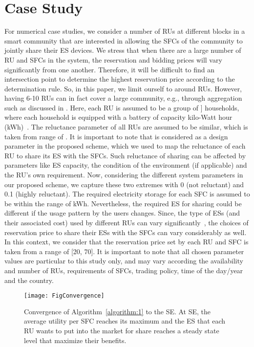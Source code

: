\documentclass[journal,10pt]{IEEEtran}
\begin{document}
\section{Case Study}\label{sec:case-study}
For numerical case studies, we consider a number of RUs at different blocks in a smart community that are interested in allowing the SFCs of the community to jointly share their ES devices. We stress that when there are a large number of RU and SFCs in the system, the reservation and bidding prices will vary significantly from one another. Therefore, it will be difficult to find an intersection point to determine the highest reservation price  according to the determination rule. So, in this paper, we limit ourself to around  RUs. However, having 6-10 RUs can in fact cover a large community, e.g., through aggregation such as discussed in \cite{Gkatzikis:2013,Wayes-J-TSG:2012}. Here, each RU is assumed to be a group of ] households, where each household is equipped with a battery of capacity  kilo-Watt hour (kWh)~\cite{battery:2013}. The reluctance parameter of all RUs are assumed to be similar, which is taken from range of . It is important to note that  is considered as a design parameter in the proposed scheme, which we used to map the reluctance of each RU to share its ES with the SFCs. Such reluctance of sharing can be affected by parameters like ES capacity, the condition of the environment (if applicable) and the RU's own requirement. Now, considering the different system parameters in our proposed scheme, we capture these two extremes with 0 (not reluctant) and 0.1 (highly reluctant). The required electricity storage for each SFC is assumed to be within the range of  kWh. Nevertheless, the required ES for sharing could be different if the usage pattern by the users changes. Since, the type of ESs (and their associated cost) used by different RUs can vary significantly~\cite{storageType:2012}, the choices of reservation price to share their ESs with the SFCs can vary considerably as well. In this context, we consider that the reservation price  set by each RU and SFC is taken from a range of [20, 70]. It is important to note that all chosen parameter values are particular to this study only, and may vary according the availability and number of RUs, requirements of SFCs, trading policy, time of the day/year and the country.

\begin{figure}[t!]
\centering
\texttt{[image: FigConvergence]}
\caption{Convergence of Algorithm~\ref{algorithm:1} to the SE. At SE, the average utility per SFC reaches its maximum and the ES that each RU wants to put into the market for share reaches a steady state level that maximize their benefits.} \label{fig:Convergence}
\end{figure}
\end{document}
